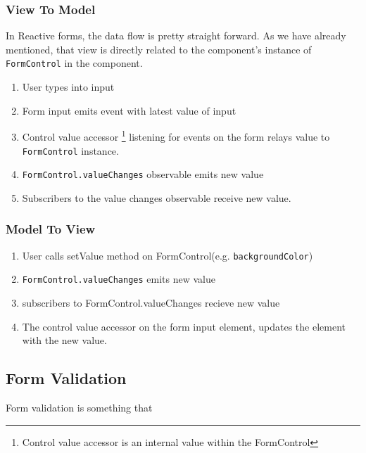 \subsubsection{View To Model}
In Reactive forms, the data flow is pretty straight forward. As we have already
mentioned, that view is directly related to the component's instance of 
\lstinline{FormControl} in the component. 
\begin{enumerate}
  \item User types into input
  \item Form input emits event with latest value of input
  \item Control value accessor \footnote{Control value accessor is an internal value within the 
  FormControl} listening for events on the form relays value 
  to \lstinline{FormControl} instance. 
  \item \lstinline{FormControl.valueChanges} observable emits new value 
  \item Subscribers to the value changes observable receive new value. 
\end{enumerate}

\subsubsection{ Model To View }
\begin{enumerate}
  \item User calls setValue method on FormControl(e.g. \lstinline{backgroundColor})
  \item \lstinline{FormControl.valueChanges} emits new value
  \item subscribers to FormControl.valueChanges recieve new value
  \item The control value accessor on the form input element, updates the 
  element with the new value. 
\end{enumerate}

\subsection{Form Validation}
Form validation is something that 
